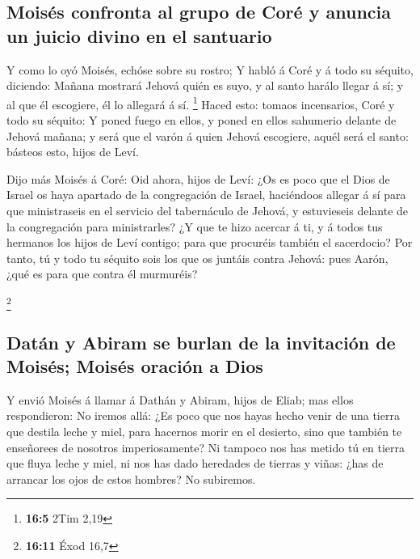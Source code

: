 \hypertarget{moisuxe9s-confronta-al-grupo-de-coruxe9-y-anuncia-un-juicio-divino-en-el-santuario}{%
\subsection{Moisés confronta al grupo de Coré y anuncia un juicio divino
en el
santuario}\label{moisuxe9s-confronta-al-grupo-de-coruxe9-y-anuncia-un-juicio-divino-en-el-santuario}}

 Y como lo oyó Moisés, echóse sobre su rostro;
 Y habló á Coré y á todo su séquito, diciendo: Mañana
mostrará Jehová quién es suyo, y al santo harálo llegar á sí; y al que
él escogiere, él lo allegará á sí. \footnote{\textbf{16:5} 2Tim 2,19}
 Haced esto: tomaos incensarios, Coré y todo su séquito:
 Y poned fuego en ellos, y poned en ellos sahumerio
delante de Jehová mañana; y será que el varón á quien Jehová escogiere,
aquél será el santo: básteos esto, hijos de Leví.

 Dijo más Moisés á Coré: Oid ahora, hijos de Leví:
 ¿Os es poco que el Dios de Israel os haya apartado de la
congregación de Israel, haciéndoos allegar á sí para que ministraseis en
el servicio del tabernáculo de Jehová, y estuvieseis delante de la
congregación para ministrarles?  ¿Y que te hizo acercar á
ti, y á todos tus hermanos los hijos de Leví contigo; para que procuréis
también el sacerdocio?  Por tanto, tú y todo tu séquito
sois los que os juntáis contra Jehová: pues Aarón, ¿qué es para que
contra él murmuréis?

\footnote{\textbf{16:11} Éxod 16,7}

\hypertarget{datuxe1n-y-abiram-se-burlan-de-la-invitaciuxf3n-de-moisuxe9s-moisuxe9s-oraciuxf3n-a-dios}{%
\subsection{Datán y Abiram se burlan de la invitación de Moisés; Moisés
oración a
Dios}\label{datuxe1n-y-abiram-se-burlan-de-la-invitaciuxf3n-de-moisuxe9s-moisuxe9s-oraciuxf3n-a-dios}}

 Y envió Moisés á llamar á Dathán y Abiram, hijos de
Eliab; mas ellos respondieron: No iremos allá:  ¿Es poco
que nos hayas hecho venir de una tierra que destila leche y miel, para
hacernos morir en el desierto, sino que también te enseñorees de
nosotros imperiosamente?  Ni tampoco nos has metido tú en
tierra que fluya leche y miel, ni nos has dado heredades de tierras y
viñas: ¿has de arrancar los ojos de estos hombres? No subiremos.


